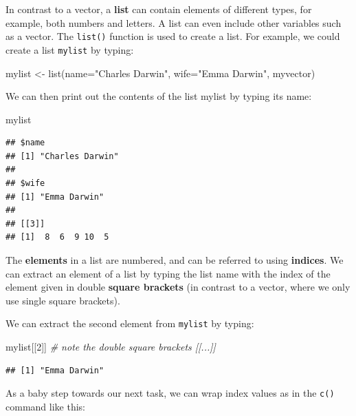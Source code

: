 \documentclass[
]{book}
\newenvironment{Shaded}{\begin{snugshade}}{\end{snugshade}}
\newcommand{\AttributeTok}[1]{\textcolor[rgb]{0.77,0.63,0.00}{#1}}
\newcommand{\CommentTok}[1]{\textcolor[rgb]{0.56,0.35,0.01}{\textit{#1}}}
\newcommand{\DecValTok}[1]{\textcolor[rgb]{0.00,0.00,0.81}{#1}}
\newcommand{\FunctionTok}[1]{\textcolor[rgb]{0.00,0.00,0.00}{#1}}
\newcommand{\NormalTok}[1]{#1}
\newcommand{\OtherTok}[1]{\textcolor[rgb]{0.56,0.35,0.01}{#1}}
\newcommand{\StringTok}[1]{\textcolor[rgb]{0.31,0.60,0.02}{#1}}
\begin{document}
In contrast to a vector, a \textbf{list} can contain elements of different types, for example, both numbers and letters. A list can even include other variables such as a vector. The \texttt{list()} function is used to create a list. For example, we could create a list \texttt{mylist} by typing:

\begin{Shaded}
\begin{Highlighting}[]
\NormalTok{mylist }\OtherTok{\textless{}{-}} \FunctionTok{list}\NormalTok{(}\AttributeTok{name=}\StringTok{"Charles Darwin"}\NormalTok{, }
               \AttributeTok{wife=}\StringTok{"Emma Darwin"}\NormalTok{, }
\NormalTok{               myvector)}
\end{Highlighting}
\end{Shaded}

We can then print out the contents of the list mylist by typing its name:

\begin{Shaded}
\begin{Highlighting}[]
\NormalTok{mylist}
\end{Highlighting}
\end{Shaded}

\begin{verbatim}
## $name
## [1] "Charles Darwin"
## 
## $wife
## [1] "Emma Darwin"
## 
## [[3]]
## [1]  8  6  9 10  5
\end{verbatim}

The \textbf{elements} in a list are numbered, and can be referred to using \textbf{indices}. We can extract an element of a list by typing the list name with the index of the element given in double \textbf{square brackets} (in contrast to a vector, where we only use single square brackets).

We can extract the second element from \texttt{mylist} by typing:

\begin{Shaded}
\begin{Highlighting}[]
\NormalTok{mylist[[}\DecValTok{2}\NormalTok{]]  }\CommentTok{\# note the double square brackets [[...]]}
\end{Highlighting}
\end{Shaded}

\begin{verbatim}
## [1] "Emma Darwin"
\end{verbatim}

As a baby step towards our next task, we can wrap index values as in the \texttt{c()} command like this:
\end{document}
